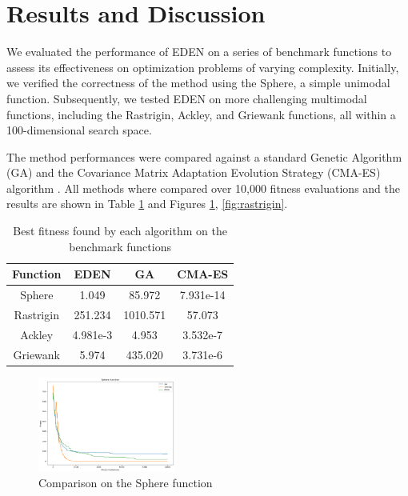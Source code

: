 \section{Results and Discussion}
\label{sec:results}

We evaluated the performance of EDEN on a series of benchmark functions to assess its effectiveness on optimization problems of varying complexity. Initially, we verified the correctness of the method using the Sphere, a simple unimodal function. Subsequently, we tested EDEN on more challenging multimodal functions, including the Rastrigin, Ackley, and Griewank functions, all within a 100-dimensional search space.


The method performances were compared against a standard Genetic Algorithm (GA) \cite{holland_ga_1992} and the Covariance Matrix Adaptation Evolution Strategy (CMA-ES) algorithm \cite{hansen_cma_2001}. All methods where compared over 10,000 fitness evaluations and the results are shown in Table \ref{tab:results} and Figures \ref{fig:sphere}, \ref{fig:rastrigin}.

\begin{table}[H]
    \centering
    \caption{Best fitness found by each algorithm on the benchmark functions}
    \begin{tabular}{|c|c|c|c|}
        \hline
        Function  & EDEN     & GA       & CMA-ES    \\
        \hline
        Sphere    & 1.049    & 85.972   & 7.931e-14 \\
        Rastrigin & 251.234  & 1010.571 & 57.073    \\
        Ackley    & 4.981e-3 & 4.953    & 3.532e-7  \\
        Griewank  & 5.974    & 435.020  & 3.731e-6  \\
        \hline
    \end{tabular}
    \label{tab:results}
\end{table}

\begin{figure}
    \centering
    \includegraphics[width=0.4\textwidth]{img/sphere.png}
    \caption{Comparison on the Sphere function}
    \label{fig:sphere}
\end{figure}

